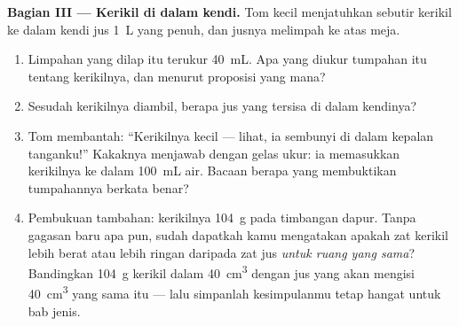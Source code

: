 \begin{problem}
\medskip\noindent\textbf{Bagian III --- Kerikil di dalam kendi.}
Tom kecil menjatuhkan sebutir kerikil ke dalam kendi jus \qty{1}{L}
yang penuh, dan jusnya melimpah ke atas meja.
\begin{enumerate}[resume]
  \item Limpahan yang dilap itu terukur \qty{40}{mL}. Apa yang
        diukur tumpahan itu tentang kerikilnya, dan menurut
        proposisi yang mana?
  \item Sesudah kerikilnya diambil, berapa jus yang tersisa di dalam
        kendinya?
  \item Tom membantah: ``Kerikilnya kecil --- lihat, ia sembunyi di
        dalam kepalan tanganku!'' Kakaknya menjawab dengan gelas
        ukur: ia memasukkan kerikilnya ke dalam \qty{100}{mL} air.
        Bacaan berapa yang membuktikan tumpahannya berkata benar?
  \item Pembukuan tambahan: kerikilnya  \qty{104}{g} pada
        timbangan dapur. Tanpa gagasan baru apa pun, sudah dapatkah
        kamu mengatakan apakah zat kerikil lebih berat atau lebih
        ringan daripada zat jus \emph{untuk ruang yang sama}?
        Bandingkan \qty{104}{g} kerikil dalam \qty{40}{cm^3} dengan
         jus yang akan mengisi \qty{40}{cm^3} yang sama itu ---
        lalu simpanlah kesimpulanmu tetap hangat untuk bab 
        jenis.
\end{enumerate}
\end{problem}
